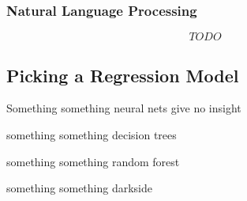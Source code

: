 \subsubsection{Natural Language Processing} %
\label{ssub:natural_language_processing}
\[TODO\]




\subsection{Picking a Regression Model} %
\label{sub:picking_a_regression_model}

Something something neural nets give no insight

something something decision trees

something something random forest

something something darkside

